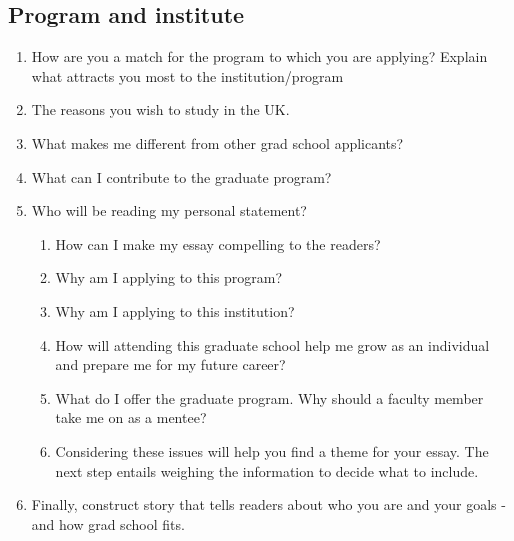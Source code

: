 \documentclass[a4paper,12pt]{article}%
\begin{document}
	  \hrulefill
	  
	  \hrulefill
	  
\subsection{Program and institute}
\label{sec:Program}
  \begin{enumerate}
	\item  How are you a  match  for the program to which you are applying? Explain what attracts you most to the institution/program 
	\item 		 	The reasons you wish to study in the UK.
	\item  	What makes me different from other grad school applicants?
\item  	What can I contribute to the graduate program?

	  \hrulefill
	  
	  \hrulefill
	  
\item Who will be reading my personal statement?
 \begin{enumerate}
 	\item How can I make my essay compelling to the readers?
	\item Why am I applying to this program?
	\item Why am I applying to this institution?
	\item How will attending this graduate school help me grow as an individual and prepare me for my future career?
	\item What do I offer the graduate program. Why should a faculty member take me on as a mentee?
	\item Considering these issues will help you find a theme for your essay. The next step entails weighing the information to decide what to include.
\end{enumerate}
	  \hrulefill
	  
	  \hrulefill
	  
\item 	 Finally, construct story that tells readers about who you are and your goals - and how grad school fits.
	\end{enumerate}
	  \hrulefill
	  
	  \hrulefill
	  
	  \hrulefill
	  
\end{document}
